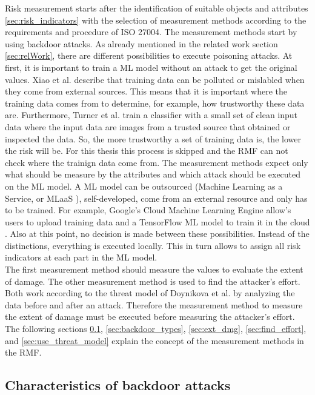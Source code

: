 Risk measurement starts after the identification of suitable objects and attributes \ref{sec:risk_indicators} with the selection of measurement methods according to the requirements and procedure of ISO 27004. The measurement methods start by using backdoor attacks. As already mentioned in the related work section \ref{sec:relWork}, there are different possibilities to execute poisoning attacks. At first, it is important to train a ML model without an attack to get the original values.
Xiao et al. \cite{DBLP:conf/sp/XiaoLZX18} describe that training data can be polluted or mislabled when they come from external sources. This means that it is important where the training data comes from to determine, for example, how trustworthy these data are. Furthermore, Turner et al. \cite{turner2018clean} train a classifier with a
small set of clean input data where the input data are images from a trusted source that obtained or inspected the data. So, the more trustworthy a set of training data is, the lower the risk will be. For this thesis this process is skipped and the RMF can not check where the trainign data come from. The measurement methods expect only what should be measure by the attributes and which attack should be executed on the ML model. A ML model can be outsourced (Machine Learning as a Service, or MLaaS \cite{DBLP:journals/corr/abs-1708-06733}), self-developed, come from an external resource and only has to be trained. For example, Google's Cloud Machine Learning Engine \cite{google_ai2022} allow's users to upload training data and a TensorFlow ML model to train it in the cloud \cite{DBLP:journals/corr/abs-1708-06733}. Also at this point, no decision is made between these possibilities. Instead of the distinctions, everything is executed locally. This in turn allows to assign all risk indicators at each part in the ML model. \\ The first measurement method should measure the values to evaluate the extent of damage. The other measurement method is used to find the attacker's effort. Both work according to the threat model of Doynikova et al. \cite{DBLP:conf/crisis/DoynikovaNGK20} by analyzing the data before and after an attack. Therefore the measurement method to measure the extent of
damage must be executed before measuring the attacker's effort. The following sections \ref{sec:charac_backdoor}, \ref{sec:backdoor_types}, \ref{sec:ext_dmg}, \ref{sec:find_effort}, and
\ref{sec:use_threat_model} explain the concept of the measurement methods in the RMF.

\subsection{Characteristics of backdoor attacks}
\label{sec:charac_backdoor}

